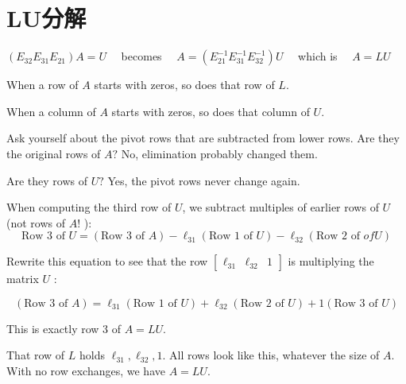 \section{LU分解}

$ \left(E_{32} E_{31} E_{21}\right) A=U \quad $ becomes $ \quad A=\left(E_{21}^{-1} E_{31}^{-1} E_{32}^{-1}\right) U \quad $ which is $ \quad A=L U $

\begin{theorem}
    When a row of $A$ starts with zeros, so does that row of $L$.

    When a column of $A$ starts with zeros, so does that column of $U$.
\end{theorem}

\begin{example}
    Ask yourself about the pivot rows that are subtracted from lower rows. Are they the original rows of $ A ? $ No, elimination probably changed them.

    Are they rows of $ U ? $ Yes, the pivot rows never change again.

    When computing the third row of $ U $, we subtract multiples of earlier rows of $ U $ (not rows of $ A ! $ ):
    $$ \text{Row 3 of }  U=(\text{Row 3 of }  A)-\ell_{31}(
        \text{Row 1 of } U)-\ell_{32}(\text{Row 2 of }  of  U) $$

    Rewrite this equation to see that the row $ \left[\begin{array}{lll}\ell_{31} & \ell_{32} & 1\end{array}\right] $ is multiplying the matrix $ U $ :

    $$ (\text{Row 3 of } A)=\ell_{31}(\text{Row 1 of }  U)+\ell_{32}(\text{Row 2 of } U)+1(\text{Row 3 of }  U) $$

    This is exactly row 3 of $ A=L U . $

    That row of $
        L $ holds $ \ell_{31}, \ell_{32}, 1 . $ All rows look like this, whatever the size of $ A $. With no row exchanges, we have $ A=L U $.
\end{example}

